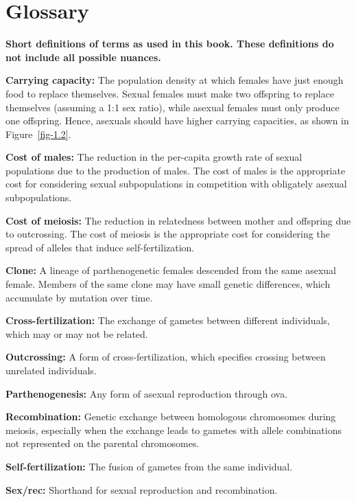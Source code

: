 \documentclass[
  letterpaper,
]{book}
\begin{document}

\chapter*{Glossary}\label{sec-glossary}


\textbf{Short definitions of terms as used in this book. These
definitions do not include all possible nuances.}

\textbf{Carrying capacity:} The population density at which females have
just enough food to replace themselves. Sexual females must make two
offspring to replace themselves (assuming a 1:1 sex ratio), while
asexual females must only produce one offspring. Hence, asexuals should
have higher carrying capacities, as shown in Figure~\ref{fig-1.2}.

\textbf{Cost of males:} The reduction in the per-capita growth rate of
sexual populations due to the production of males. The cost of males is
the appropriate cost for considering sexual subpopulations in
competition with obligately asexual subpopulations.

\textbf{Cost of meiosis:} The reduction in relatedness between mother
and offspring due to outcrossing. The cost of meiosis is the appropriate
cost for considering the spread of alleles that induce
self-fertilization.

\textbf{Clone:} A lineage of parthenogenetic females descended from the
same asexual female. Members of the same clone may have small genetic
differences, which accumulate by mutation over time.

\textbf{Cross-fertilization:} The exchange of gametes between different
individuals, which may or may not be related.

\textbf{Outcrossing:} A form of cross-fertilization, which specifies
crossing between unrelated individuals.

\textbf{Parthenogenesis:} Any form of asexual reproduction through ova.

\textbf{Recombination:} Genetic exchange between homologous chromosomes
during meiosis, especially when the exchange leads to gametes with
allele combinations not represented on the parental chromosomes.

\textbf{Self-fertilization:} The fusion of gametes from the same
individual.

\textbf{Sex/rec:} Shorthand for sexual reproduction and recombination.
\end{document}
